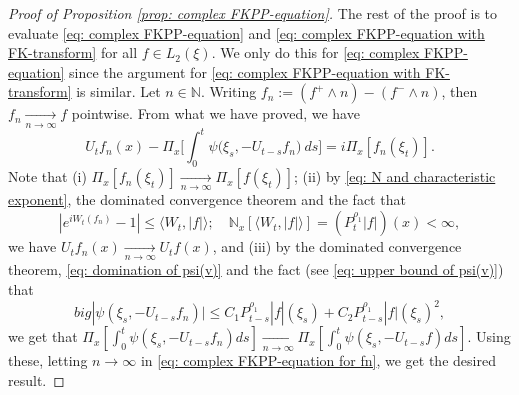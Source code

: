 \documentclass[12pt,a4paper]{amsart}
\theoremstyle{plain}
\theoremstyle{definition}
\numberwithin{equation}{section}
\begin{document}
\begin{proof}[Proof of Proposition \ref{prop: complex FKPP-equation}]
    The rest of the proof is to evaluate \eqref{eq: complex FKPP-equation} and \eqref{eq: complex FKPP-equation with FK-transform} for all $f\in L_2(\xi)$. We only do this for \eqref{eq: complex FKPP-equation} since the argument for \eqref{eq: complex FKPP-equation with FK-transform} is similar.
    Let $n \in \mathbb N$.
    Writing $f_n := (f^+ \wedge n) - (f^- \wedge n)$, then $f_n \xrightarrow[n\to \infty]{} f$ pointwise.
    From what we have proved, we have
\begin{equation}
\label{eq: complex FKPP-equation for fn}
    U_tf_n(x) - \Pi_{x} \Big[\int_0^t \psi\big(\xi_s, - U_{t-s}f_n\big) ~ds\Big]
    = i \Pi_{x} [f_n(\xi_t)].
\end{equation}
Note that 
(i) $\Pi_{x}[f_n(\xi_t)] \xrightarrow[n\to \infty]{} \Pi_{x}[f(\xi_t)]$;
(ii) by \eqref{eq: N and characteristic exponent}, the dominated convergence theorem and the fact that
\[
 |e^{i W_t(f_n)} - 1| \leq \langle W_t, |f|\rangle;
  \quad \mathbb N_x[\langle W_t, |f|\rangle] = (P_t^{\rho_1} |f|)(x) < \infty,
\]
we have $U_tf_n(x) \xrightarrow[n\to \infty]{} U_tf(x)$, and (iii) by the dominated convergence theorem, \eqref{eq: domination of psi(v)} and the fact (see \eqref{eq: upper bound of psi(v)}) that
\[
big|\psi(\xi_s,- U_{t-s}f_n)\big|
   \leq C_1 P_{t-s}^{\rho_1}|f|(\xi_s)+C_2 P_{t-s}^{\rho_1}|f|(\xi_s)^2,
\]
we get that $\Pi_{x} [\int_0^t \psi(\xi_s,- U_{t-s}f_n)ds] \xrightarrow[n\to \infty]{} \Pi_{x} [\int_0^t \psi(\xi_s,- U_{t-s}f)ds]$.
Using these, 
    letting $n \to \infty$ in \eqref{eq: complex FKPP-equation for fn}, we get the desired result.
\end{proof}
\end{document}
